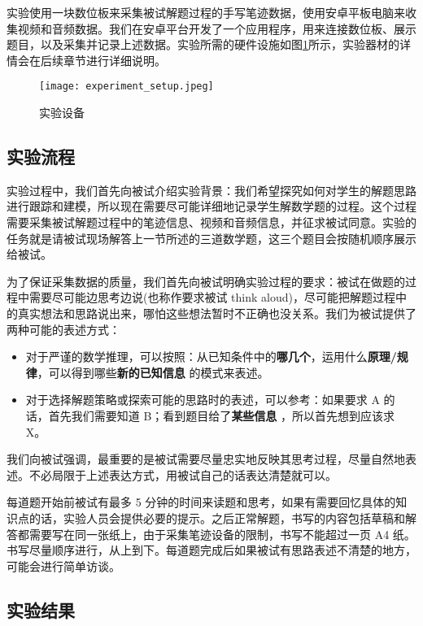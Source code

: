 实验使用一块数位板来采集被试解题过程的手写笔迹数据，使用安卓平板电脑来收集视频和音频数据。我们在安卓平台开发了一个应用程序，用来连接数位板、展示题目，以及采集并记录上述数据。实验所需的硬件设施如图\ref{fig:experiment_setup}所示，实验器材的详情会在后续章节进行详细说明。

\begin{figure}
    \centering
    \texttt{[image: experiment\_setup.jpeg]}
    \caption{实验设备}
    \label{fig:experiment_setup}
\end{figure}

\subsection{实验流程}

实验过程中，我们首先向被试介绍实验背景：我们希望探究如何对学生的解题思路进行跟踪和建模，所以现在需要尽可能详细地记录学生解数学题的过程。这个过程需要采集被试解题过程中的笔迹信息、视频和音频信息，并征求被试同意。实验的任务就是请被试现场解答上一节所述的三道数学题，这三个题目会按随机顺序展示给被试。

为了保证采集数据的质量，我们首先向被试明确实验过程的要求：被试在做题的过程中需要尽可能边思考边说(也称作要求被试 think aloud)，尽可能把解题过程中的真实想法和思路说出来，哪怕这些想法暂时不正确也没关系。我们为被试提供了两种可能的表述方式：

\begin{itemize}
    \item 对于严谨的数学推理，可以按照：从已知条件中的\textbf{哪几个}，运用什么\textbf{原理/规律}，可以得到哪些\textbf{新的已知信息} 的模式来表述。
    \item 对于选择解题策略或探索可能的思路时的表述，可以参考：如果要求 A 的话，首先我们需要知道 B；看到题目给了\textbf{某些信息} ，所以首先想到应该求 X。
\end{itemize}

我们向被试强调，最重要的是被试需要尽量忠实地反映其思考过程，尽量自然地表述。不必局限于上述表达方式，用被试自己的话表达清楚就可以。

每道题开始前被试有最多 5 分钟的时间来读题和思考，如果有需要回忆具体的知识点的话，实验人员会提供必要的提示。之后正常解题，书写的内容包括草稿和解答都需要写在同一张纸上，由于采集笔迹设备的限制，书写不能超过一页 A4 纸。书写尽量顺序进行，从上到下。每道题完成后如果被试有思路表述不清楚的地方，可能会进行简单访谈。

\subsection{实验结果}

